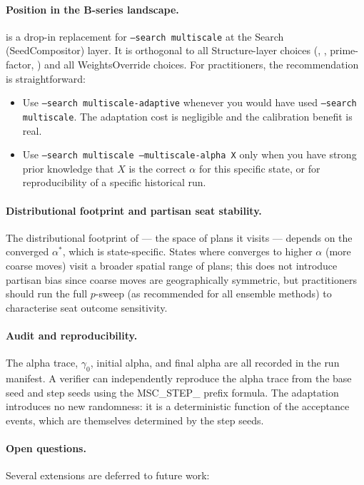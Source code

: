 \paragraph{Position in the B-series landscape.}
\ams{} is a drop-in replacement for \texttt{--search multiscale} at the
Search (SeedCompositor) layer.
It is orthogonal to all Structure-layer choices (\geosec{}, \areasec{},
prime-factor, \sa{}) and all WeightsOverride choices.
For practitioners, the recommendation is straightforward:
\begin{itemize}
  \item Use \texttt{--search multiscale-adaptive} whenever you would have
    used \texttt{--search multiscale}.
    The adaptation cost is negligible and the calibration benefit is real.
  \item Use \texttt{--search multiscale --multiscale-alpha X} only when you
    have strong prior knowledge that $X$ is the correct $\alpha$ for this
    specific state, or for reproducibility of a specific historical run.
\end{itemize}

\paragraph{Distributional footprint and partisan seat stability.}
The distributional footprint of \ams{} --- the space of plans it visits ---
depends on the converged $\alpha^*$, which is state-specific.
States where \ams{} converges to higher $\alpha$ (more coarse moves) visit
a broader spatial range of plans; this does not introduce partisan bias since
coarse moves are geographically symmetric, but practitioners should run the
full $p$-sweep (as recommended for all ensemble methods) to characterise
seat outcome sensitivity.

\paragraph{Audit and reproducibility.}
The alpha trace, $\gamma_0$, initial alpha, and final alpha are all recorded
in the run manifest.
A verifier can independently reproduce the alpha trace from the base seed
and step seeds using the MSC\_STEP\_ prefix formula.
The adaptation introduces no new randomness: it is a deterministic function
of the acceptance events, which are themselves determined by the step seeds.

\paragraph{Open questions.}
Several extensions are deferred to future work:

